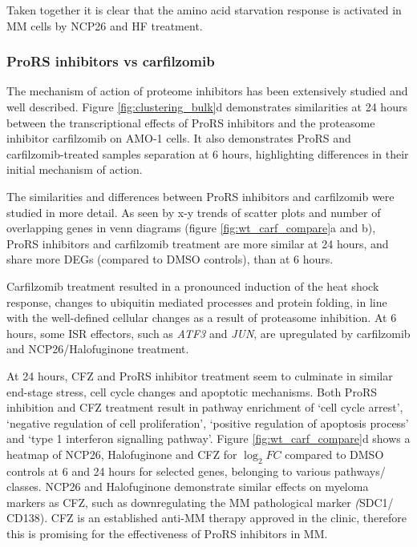 Taken together it is clear that the amino acid starvation response is activated in MM cells by NCP26 and HF treatment.

\subsubsection{ProRS inhibitors vs carfilzomib}
The mechanism of action of proteome inhibitors has been extensively studied and well described.
Figure \ref{fig:clustering_bulk}d demonstrates similarities at 24 hours between the transcriptional effects of ProRS inhibitors and the proteasome inhibitor carfilzomib on AMO-1 cells.
It also demonstrates ProRS and carfilzomib-treated samples separation at 6 hours, highlighting differences in their initial mechanism of action.

The similarities and differences between ProRS inhibitors and carfilzomib were studied in more detail.
As seen by x-y trends of scatter plots and number of overlapping genes in venn diagrams (figure \ref{fig:wt_carf_compare}a and b), ProRS inhibitors and carfilzomib treatment are more similar at 24 hours, and share more DEGs (compared to DMSO controls), than at 6 hours.


Carfilzomib treatment resulted in a pronounced induction of the heat shock response, changes to ubiquitin mediated processes and protein folding, in line with the well-defined cellular changes as a result of proteasome inhibition.
At 6 hours, some ISR effectors, such as \textit{ATF3} and \textit{JUN}, are upregulated by carfilzomib and NCP26/Halofuginone treatment.

At 24 hours, CFZ and ProRS inhibitor treatment seem to culminate in similar end-stage stress, cell cycle changes and apoptotic mechanisms.
Both ProRS inhibition and CFZ treatment result in pathway enrichment of `cell cycle arrest', `negative regulation of cell proliferation', `positive regulation of apoptosis process' and `type 1 interferon signalling pathway'.
Figure \ref{fig:wt_carf_compare}d shows a heatmap of NCP26, Halofuginone and CFZ for $\log_{2}FC$ compared to DMSO controls at 6 and 24 hours for selected genes, belonging to various pathways/ classes.
NCP26 and Halofuginone demonstrate similar effects on myeloma markers as CFZ, such as downregulating the MM pathological marker \textit(SDC1/ CD138).
CFZ is an established anti-MM therapy approved in the clinic, therefore this is promising for the effectiveness of ProRS inhibitors in MM.



